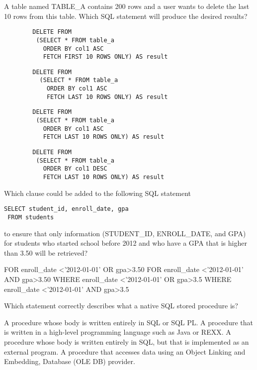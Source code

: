 \documentclass[11pt]{exam}
\begin{document}
\begin{questions}
\question[1]
A table named TABLE\_A contains 200 rows and a user wants to delete
the last 10 rows from this table. Which SQL statement will produce the
desired results?
\begin{choices}
\choice \begin{verbatim}
		DELETE FROM
		 (SELECT * FROM table_a 
		   ORDER BY col1 ASC
		   FETCH FIRST 10 ROWS ONLY) AS result
		\end{verbatim}
\choice \begin{verbatim}
		DELETE FROM
		  (SELECT * FROM table_a
			ORDER BY col1 ASC
			FETCH LAST 10 ROWS ONLY) AS result
		\end{verbatim}
\choice \begin{verbatim}
		DELETE FROM
		 (SELECT * FROM table_a
		   ORDER BY col1 ASC
		   FETCH LAST 10 ROWS ONLY) AS result
		\end{verbatim}
\choice \begin{verbatim}
		DELETE FROM
		 (SELECT * FROM table_a
		   ORDER BY col1 DESC
		   FETCH LAST 10 ROWS ONLY) AS result
		\end{verbatim}
\end{choices}

\question[1]
Which clause could be added to the following SQL statement
\begin{verbatim}
SELECT student_id, enroll_date, gpa
 FROM students
\end{verbatim}
to ensure that only information (STUDENT\_ID, ENROLL\_DATE, and
GPA) for students who started school before 2012 and who have a GPA
that is higher than 3.50 will be retrieved?
\begin{choices}
\choice FOR enroll\_date <'2012-01-01' OR gpa>3.50
\choice FOR enroll\_date <'2012-01-01' AND gpa>3.50
\choice WHERE enroll\_date <'2012-01-01' OR gpa>3.5
\choice	WHERE enroll\_date <'2012-01-01' AND gpa>3.5
\end{choices}

\question[1]
Which statement correctly describes what a native SQL stored procedure is?
\begin{choices}
\choice A procedure whose body is written entirely in SQL or SQL PL.
\choice A procedure that is written in a high-level programming language such as Java or REXX.
\choice A procedure whose body is written entirely in SQL, but that is implemented as an external program.
\choice	A procedure that accesses data using an Object Linking and Embedding, Database (OLE DB) provider.
\end{choices}


\end{questions}
\end{document}
